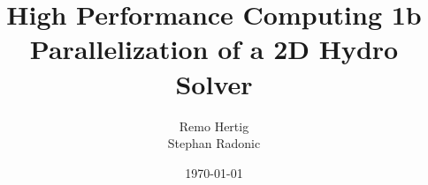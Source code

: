 \documentclass{beamer}
\title[HPC 1b]{High Performance Computing 1b \\
Parallelization of a 2D Hydro Solver} %
\author[Hertig, Radonic]{Remo Hertig\\
Stephan Radonic} %
\institute[UZH] %
{
University of Zurich
}
\date{\today} %
\begin{document}
\begin{frame}
\titlepage %
\end{frame}


\end{document}
